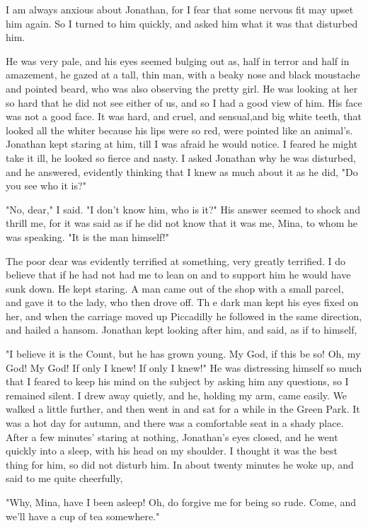 I am always anxious about Jonathan, for I fear that some nervous fit may upset him again. So I turned to him quickly, and asked him what it was that disturbed him. 

He was very pale, and his eyes seemed bulging out as, half in terror and half in amazement, he gazed at a tall, thin man, with a beaky nose and black moustache and pointed beard, who was also observing the pretty girl. He was looking at her so hard that he did not see either of us, and so I had a good view of him. His face was not a good face. It was hard, and cruel, and sensual,and big white teeth, that looked all the whiter because his lips were so red, were pointed like an animal's. Jonathan kept staring at him, till I was afraid he would notice. I feared he might take it ill, he looked so fierce and nasty. I asked Jonathan why he was disturbed, and he answered, evidently thinking that I knew as much about it as he did, "Do you see who it is?" 

"No, dear," I said. "I don't know him, who is it?" His answer seemed to shock and thrill me, for it was said as if he did not know that it was me, Mina, to whom he was speaking. "It is the man himself!" 

The poor dear was evidently terrified at something, very greatly terrified. I do believe that if he had not had me to lean on and to support him he would have sunk down. He kept staring. A man came out of the shop with a small parcel, and gave it to the lady, who then drove off. Th e dark man kept his eyes fixed on her, and when the carriage moved up Piccadilly he followed in the same direction, and hailed a hansom. Jonathan kept looking after him, and said, as if to himself, 

"I believe it is the Count, but he has grown young. My God, if this be so! Oh, my God! My God! If only I knew! If only I knew!" He was distressing himself so much that I feared to keep his mind on the subject by asking him any questions, so I remained silent. I drew away quietly, and he, holding my arm, came easily. We walked a little further, and then went in and sat for a while in the Green Park. It was a hot day for autumn, and there was a comfortable seat in a shady place. After a few minutes' staring at nothing, Jonathan's eyes closed, and he went quickly into a sleep, with his head on my shoulder. I thought it was the best thing for him, so did not disturb him. In about twenty minutes he woke up, and said to me quite cheerfully, 

"Why, Mina, have I been asleep! Oh, do forgive me for being so rude. Come, and we'll have a cup of tea somewhere." 

